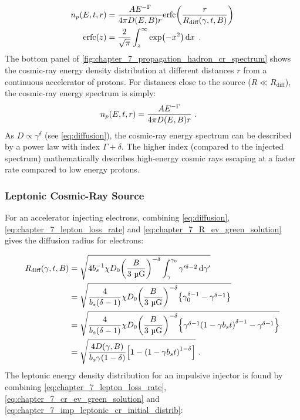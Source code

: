 \begin{equation}
    \begin{aligned}
    n_p\qty(E,t,r)&=\frac{AE^{-\Gamma}}{4\pi D\qty(E,B)r}\text{erfc}\qty(\frac{r}{R_\text{diff}\qty(\gamma,t,B)}) \\
    \text{erfc}\qty(z)&=\frac{2}{\sqrt{\pi}}\int_z^\infty \exp(-x^2)\dd{x}\text{ .}
    \end{aligned} \label{eq:chapter_7_crpropev_hadronic_continuous}
\end{equation}
\noindent The bottom panel of \autoref{fig:chapter_7_propagation_hadron_cr_spectrum} shows the cosmic-ray energy density distribution at different distances $r$ from a continuous accelerator of protons. For distances close to the source ($R\ll R_\text{diff}$), the cosmic-ray energy spectrum is simply:
\begin{equation}
    \begin{aligned}
 	   n_p\qty(E,t,r)&=\frac{AE^{-\Gamma}}{4\pi D\qty(E,B)r}\text{ .}
    \end{aligned} 
\end{equation}
\noindent As $D\propto \gamma^{\delta}$ (see \autoref{eq:diffusion}), the cosmic-ray energy spectrum can be described by a power law with index $\Gamma+\delta$. The higher index (compared to the injected spectrum) mathematically describes high-energy cosmic rays escaping at a faster rate compared to low energy protons.

\subsubsection{Leptonic Cosmic-Ray Source}

For an accelerator injecting electrons, combining \autoref{eq:diffusion},  \autoref{eq:chapter_7_lepton_loss_rate} and \autoref{eq:chapter_7_R_ev_green_solution} gives the diffusion radius for electrons:

\begin{equation}
	\begin{aligned}
		R_\text{diff}\qty(\gamma,t,B)&=\sqrt{4b_s^{-1} \chi D_0\qty(\frac{B}{3~\si{\micro G}})^{-\delta}\int_\gamma^{\gamma_0}\gamma'^{\delta-2}\dd{\gamma'}} \\
		&=\sqrt{\frac{4}{b_s(\delta-1)} \chi D_0\qty(\frac{B}{3~\si{\micro G}})^{-\delta} \qty{\gamma_0^{\delta-1}-\gamma^{\delta-1}} } \\
		&=\sqrt{\frac{4}{b_s(\delta-1)} \chi D_0\qty(\frac{B}{3~\si{\micro G}})^{-\delta} \qty{\gamma^{\delta-1}\qty(1-\gamma b_st)^{\delta-1}-\gamma^{\delta-1}} } \\
		&=\sqrt{\frac{4D\qty(\gamma,B)}{b_s\gamma\qty(1-\delta)}\qty[1-\qty(1-\gamma b_s t)^{1-\delta}]}\text{ .}
	\end{aligned} \label{eq:chapter_7_Rdiff_leptonic_impulsive}
\end{equation} 
\noindent The leptonic energy density distribution for an impulsive injector is found by combining \autoref{eq:chapter_7_lepton_loss_rate}, \autoref{eq:chapter_7_cr_ev_green_solution} and \autoref{eq:chapter_7_imp_leptonic_cr_initial_distrib}:

